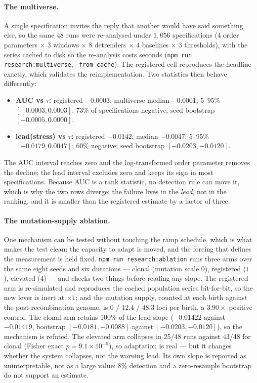 \documentclass[11pt,a4paper]{article}
\begin{document}
\paragraph{The multiverse.} A single specification invites the reply that another
would have said something else, so the same 48 runs were re-analysed under
$1{,}056$ specifications ($4$ order parameters $\times$ $3$ windows $\times$ $8$
detrenders $\times$ $4$ baselines $\times$ $3$ thresholds), with the series
cached to disk so the re-analysis costs seconds
(\texttt{npm run research:multiverse}, \texttt{--from-cache}). The registered
cell reproduces the headline exactly, which validates the reimplementation. Two
statistics then behave differently:

\begin{itemize}\setlength\itemsep{0pt}
\item \textbf{AUC vs $\tau$:} registered $-0.0003$; multiverse median $-0.0001$;
5--95\% $[-0.0003, 0.0003]$; 73\% of specifications negative; seed bootstrap
$[-0.0005, 0.0000]$.
\item \textbf{lead(stress) vs $\tau$:} registered $-0.0142$; median $-0.0047$;
5--95\% $[-0.0179, 0.0047]$; 60\% negative; seed bootstrap $[-0.0203, -0.0120]$.
\end{itemize}

The AUC interval reaches zero and the log-transformed order parameter removes
the decline; the lead interval excludes zero and keeps its sign in most
specifications. Because AUC is a rank statistic, no detection rule can move it,
which is why the two rows diverge: the failure lives in the \emph{lead}, not in
the ranking, and it is smaller than the registered estimate by a factor of three.

\paragraph{The mutation-supply ablation.} One mechanism can be tested without
touching the ramp schedule, which is what makes the test clean: the capacity to
adapt is moved, and the forcing that defines the measurement is held fixed.
\texttt{npm run research:ablation} runs three arms over the same eight seeds and
six durations --- clonal (mutation scale $0$), registered ($1$), elevated ($4$)
--- and checks two things before reading any slope. The registered arm is
re-simulated and reproduces the cached population series bit-for-bit, so the new
lever is inert at $\times1$; and the mutation supply, counted at each birth
against the post-recombination genome, is $0$ / $12.4$ / $48.3$ loci per birth, a
$3.90\times$ positive control. The clonal arm retains 100\% of the lead slope
($-0.01422$ against $-0.01419$, bootstrap $[-0.0181,-0.0088]$ against
$[-0.0203,-0.0120]$), so the mechanism is refuted. The elevated arm collapses in
25/48 runs against 43/48 for clonal (Fisher exact $p = 9.1\times10^{-5}$), so
adaptation is real --- but it changes whether the system collapses, not the
warning lead. Its own slope is reported as uninterpretable, not as a large value:
8\% detection and a zero-resample bootstrap do not support an estimate.
\end{document}
